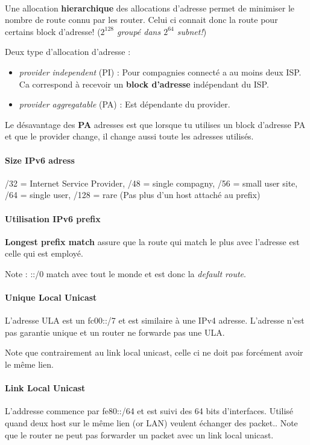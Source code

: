 \paragraph{ }
Une allocation \textbf{hierarchique} des allocations d'adresse permet de minimiser
le nombre de route connu par les router. Celui ci connait donc la route pour
certains block d'adresse!
(\textit{$2^{128}$ groupé dans $2^{64}$ subnet!})

Deux type d'allocation d'adresse :
\begin{itemize}
    \item \textit{provider independent} (PI) : Pour compagnies connecté a au moins deux ISP. 
        Ca correspond à recevoir un \textbf{block d'adresse} indépendant du ISP.
    \item \textit{provider aggregatable} (PA) : Est dépendante du provider.
\end{itemize}

Le désavantage des \textbf{PA} adresses est que lorsque tu utilises un block d'adresse PA
et que le provider change, il change aussi toute les adresses utilisés.

\paragraph{Size IPv6 adress}
/32 = Internet Service Provider, /48 = single compagny, /56 = small user site,
/64 = single user, /128 = rare (Pas plus d'un host attaché au prefix)

\paragraph{Utilisation IPv6 prefix}
\textbf{Longest prefix match} assure que la route qui match le plus avec
l'adresse est celle qui est employé.

Note : ::/0 match avec tout le monde et est donc la \textit{default route}.

\paragraph{\textbf{Unique Local Unicast}}
L'adresse ULA est un fc00::/7 et est similaire à une IPv4 adresse.
L'adresse n'est pas garantie unique et un router ne forwarde pas
une ULA.

Note que contrairement au link local unicast, celle ci ne doit pas forcément
avoir le même lien.

\paragraph{\textbf{Link Local Unicast}}
L'addresse commence par fe80::/64 et est suivi des 64 bits d'interfaces.
Utilisé quand deux host sur le même lien (or LAN) veulent échanger des
packet.. Note que le router ne peut pas forwarder un packet avec un
link local unicast.

